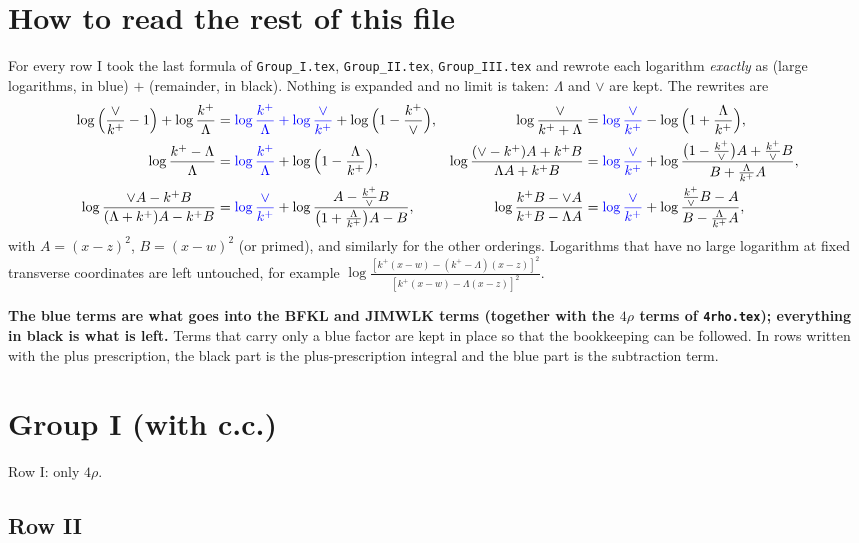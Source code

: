 \documentclass[9pt]{article}
\numberwithin{equation}{section}
\begin{document}
\section{How to read the rest of this file}
For every row I took the last formula of \texttt{Group\_I.tex}, \texttt{Group\_II.tex}, \texttt{Group\_III.tex} and rewrote each logarithm \emph{exactly} as
(large logarithms, in {\color{blue}blue}) $+$ (remainder, in black). Nothing is expanded and no limit is taken: $\Lambda$ and $\vee$ are kept. The rewrites are
\begin{align}
\log\Big(\frac{\vee}{k^{+}}-1\Big)+\log\frac{k^{+}}{\Lambda}&={\color{blue}\log\frac{k^{+}}{\Lambda}+\log\frac{\vee}{k^{+}}}+\log\Big(1-\frac{k^{+}}{\vee}\Big),&
\log\frac{\vee}{k^{+}+\Lambda}&={\color{blue}\log\frac{\vee}{k^{+}}}-\log\Big(1+\frac{\Lambda}{k^{+}}\Big),\notag\\
\log\frac{k^{+}-\Lambda}{\Lambda}&={\color{blue}\log\frac{k^{+}}{\Lambda}}+\log\Big(1-\frac{\Lambda}{k^{+}}\Big),&
\log\frac{(\vee-k^{+})A+k^{+}B}{\Lambda A+k^{+}B}&={\color{blue}\log\frac{\vee}{k^{+}}}+\log\frac{\big(1-\frac{k^{+}}{\vee}\big)A+\frac{k^{+}}{\vee}B}{B+\frac{\Lambda}{k^{+}}A},\notag\\
\log\frac{\vee A-k^{+}B}{(\Lambda+k^{+})A-k^{+}B}&={\color{blue}\log\frac{\vee}{k^{+}}}+\log\frac{A-\frac{k^{+}}{\vee}B}{\big(1+\frac{\Lambda}{k^{+}}\big)A-B},&
\log\frac{k^{+}B-\vee A}{k^{+}B-\Lambda A}&={\color{blue}\log\frac{\vee}{k^{+}}}+\log\frac{\frac{k^{+}}{\vee}B-A}{B-\frac{\Lambda}{k^{+}}A},
\end{align}
with $A=(x-z)^{2}$, $B=(x-w)^{2}$ (or primed), and similarly for the other orderings. Logarithms that have no large logarithm at fixed transverse coordinates are left untouched, for example $\log\frac{[k^{+}(x-w)-(k^{+}-\Lambda)(x-z)]^{2}}{[k^{+}(x-w)-\Lambda(x-z)]^{2}}$.

\textbf{The blue terms are what goes into the BFKL and JIMWLK terms (together with the $4\rho$ terms of \texttt{4rho.tex}); everything in black is what is left.} Terms that carry only a blue factor are kept in place so that the bookkeeping can be followed. In rows written with the plus prescription, the black part is the plus-prescription integral and the blue part is the subtraction term.
\section{Group I (with c.c.)}
Row I: only $4\rho$.

\subsection{Row II}
\end{document}
